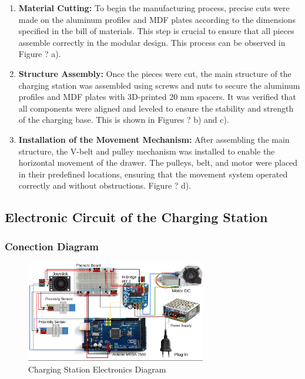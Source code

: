     \begin{enumerate}
        \item \textbf{Material Cutting:} To begin the manufacturing process, precise cuts were made on the aluminum profiles and MDF plates according to the dimensions specified in the bill of materials. This step is crucial to ensure that all pieces assemble correctly in the modular design. This process can be observed in Figure ? a).
            
        \item \textbf{Structure Assembly:} Once the pieces were cut, the main structure of the charging station was assembled using screws and nuts to secure the aluminum profiles and MDF plates with 3D-printed 20 mm spacers. It was verified that all components were aligned and leveled to ensure the stability and strength of the charging base. This is shown in Figures ? b) and c).
            
        \item \textbf{Installation of the Movement Mechanism:} After assembling the main structure, the V-belt and pulley mechanism was installed to enable the horizontal movement of the drawer. The pulleys, belt, and motor were placed in their predefined locations, ensuring that the movement system operated correctly and without obstructions. Figure ? d).
        
    \end{enumerate}



\subsection{Electronic Circuit of the Charging Station}

    \subsubsection{Conection Diagram}
    
    \begin{figure}[H]
        \centering
        \includegraphics[width=0.7\textwidth]{pictures/station_electronics_diagram.png}
        \caption{Charging Station Electronics Diagram}
        \label{fig:station_electronics_diagram}
    \end{figure}
    
